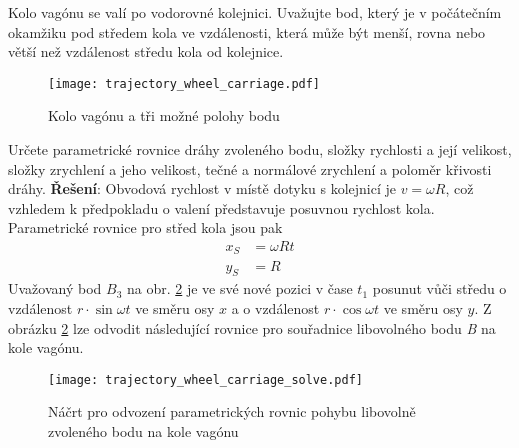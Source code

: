         \begin{example}
          Kolo vagónu se valí po vodorovné kolejnici. Uvažujte bod, který je v počátečním okamžiku
          pod středem kola ve vzdálenosti, která může být menší, rovna nebo větší než vzdálenost
          středu kola od kolejnice.
          \begin{figure}[ht!]
            \centering
            \texttt{[image: trajectory\_wheel\_carriage.pdf]}
            \caption{Kolo vagónu a tři možné polohy bodu}
            \label{mech:fig_wheel_1}
          \end{figure}
          \newline
          Určete  parametrické rovnice dráhy zvoleného bodu, složky rychlosti a její velikost,
          složky zrychlení a jeho velikost, tečné a normálové zrychlení a poloměr křivosti dráhy.
          \cite[p.~11]{Slavik}
          \newline
          \textbf{Řešení}: Obvodová rychlost v místě dotyku s kolejnicí je $v=\omega R$, což
          vzhledem k předpokladu o valení představuje posuvnou rychlost kola. Parametrické
          rovnice pro střed kola jsou pak
          \begin{align}\label{mech:eq_wheel_center}
            x_S &= \omega R t \\
            y_S &= R
          \end{align}
          Uvažovaný bod $B_3$ na obr. \ref{mech:fig_wheel_xy} je ve své nové pozici v čase $t_1$
          posunut vůči středu o vzdálenost $r\cdot\sin\omega t$ ve směru osy $x$ a o vzdálenost
          $r\cdot\cos\omega t$ ve směru osy $y$. Z obrázku \ref{mech:fig_wheel_xy} lze odvodit
          následující rovnice pro souřadnice libovolného bodu \emph{B} na kole vagónu.
          \begin{figure}[ht!]
            \centering
            \texttt{[image: trajectory\_wheel\_carriage\_solve.pdf]}
            \caption[Náčrt pro odvození rovnic pohybu bodu na kole vagónu]{Náčrt pro odvození
                     parametrických rovnic pohybu libovolně zvoleného bodu na kole vagónu}
            \label{mech:fig_wheel_xy}
          \end{figure}
                   

\end{example}
